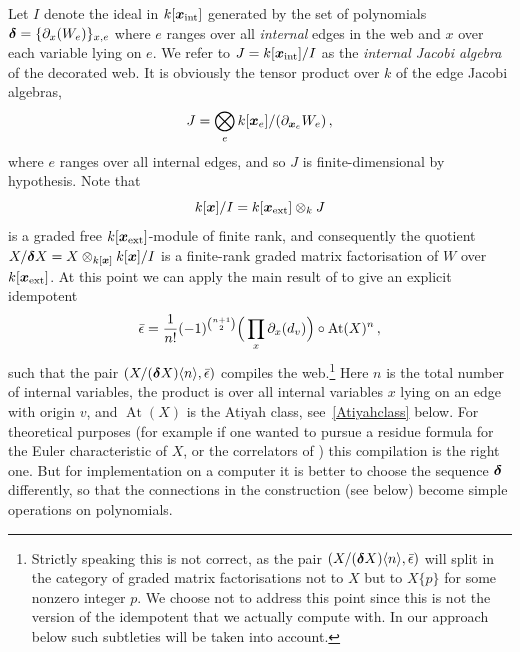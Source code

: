 \documentclass{compositio}
\theoremstyle{definition}
\numberwithin{equation}{section}
\DeclareMathOperator{\At}{At}
\begin{document}
Let $I$ denote the ideal in $k[\boldsymbol{x}_{\textup{int}}]$ generated by the set of polynomials $\boldsymbol{\delta} = \{\partial_x(W_e)\}_{x,e}$ where $e$ ranges over all \emph{internal} edges in the web and $x$ over each variable lying on $e$. We refer to $J = k[\boldsymbol{x}_{\textup{int}}]/I$ as the \emph{internal Jacobi algebra} of the decorated web. It is obviously the tensor product over $k$ of the edge Jacobi algebras, 
\[
J = \bigotimes_{e} k[\boldsymbol{x}_e]/(\partial_{\boldsymbol{x}_e} W_e) \, ,
\]
where $e$ ranges over all internal edges, and so $J$ is finite-dimensional by hypothesis. Note that
\[
k[\boldsymbol{x}]/I = k[\boldsymbol{x}_{\textup{ext}}] \otimes_k J
\]
is a graded free $k[\boldsymbol{x}_{\textup{ext}}]$-module of finite rank, and consequently the quotient $X/\boldsymbol{\delta} X = X \otimes_{k[\boldsymbol{x}]} k[\boldsymbol{x}]/I$ is a finite-rank graded matrix factorisation of $W$ over $k[\boldsymbol{x}_{\textup{ext}}]$. At this point we can apply the main result of \cite{dm1102.2957} to give an explicit idempotent
\[
\bar\idem = \frac{1}{n!}(-1)^{\binom{n+1}{2}} \Big(\prod_x \partial_x(d_v)\Big) \circ \At(X)^n\,,
\]
such that the pair $(X/(\boldsymbol{\delta} X)\langle n \rangle, \bar{\epsilon})$ compiles the web.\footnote{Strictly speaking this is not correct, as the pair $(X/(\boldsymbol{\delta} X)\langle n \rangle, \bar{\epsilon})$ will split in the category of graded matrix factorisations not to $X$ but to $X\{ p \}$ for some nonzero integer $p$. We choose not to address this point since this is not the version of the idempotent that we actually compute with. In our approach below such subtleties will be taken into account.} Here $n$ is the total number of internal variables, the product is over all internal variables $x$ lying on an edge with origin $v$, and $\At(X)$ is the Atiyah class, see~\eqref{Atiyahclass} below. For theoretical purposes (for example if one wanted to pursue a residue formula for the Euler characteristic of $X$, or the correlators of \cite{kr0404189}) this compilation is the right one. But for implementation on a computer it is better to choose the sequence $\boldsymbol{\delta}$ differently, so that the connections in the construction (see below) become simple operations on polynomials.
\\
\end{document}
